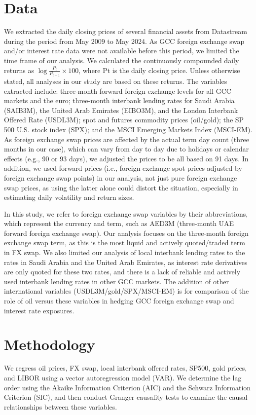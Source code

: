 \documentclass[12pt]{article}
\begin{document}
\begin{sloppypar}
\section{Data}
We extracted the daily closing prices of several financial assets from Datastream during the period from May 2009 to May 2024. As GCC foreign exchange swap and/or interest rate data were not available before this period, we limited the time frame of our analysis. We calculated the continuously compounded daily returns as $\log \frac{P_t}{P_{t-1}}\times 100$, where Pt is the daily closing price. Unless otherwise stated, all analyses in our study are based on these returns. The variables extracted include: three-month forward foreign exchange levels for all GCC markets and the euro; three-month interbank lending rates for Saudi Arabia (SAIB3M), the United Arab Emirates (EIBO3M), and the London Interbank Offered Rate (USDL3M); spot and futures commodity prices (oil/gold); the SP 500 U.S. stock index (SPX); and the MSCI Emerging Markets Index (MSCI-EM). As foreign exchange swap prices are affected by the actual term day count (three months in our case), which can vary from day to day due to holidays or calendar effects (e.g., 90 or 93 days), we adjusted the prices to be all based on 91 days. In addition, we used forward prices (i.e., foreign exchange spot prices adjusted by foreign exchange swap points) in our analysis, not just pure foreign exchange swap prices, as using the latter alone could distort the situation, especially in estimating daily volatility and return sizes. 

In this study, we refer to foreign exchange swap variables by their abbreviations, which represent the currency and term, such as AED3M (three-month UAE forward foreign exchange swap). Our analysis focuses on the three-month foreign exchange swap term, as this is the most liquid and actively quoted/traded term in FX swap. We also limited our analysis of local interbank lending rates to the rates in Saudi Arabia and the United Arab Emirates, as interest rate derivatives are only quoted for these two rates, and there is a lack of reliable and actively used interbank lending rates in other GCC markets. The addition of other international variables (USDL3M/gold/SPX/MSCI-EM) is for comparison of the role of oil versus these variables in hedging GCC foreign exchange swap and interest rate exposures.

\newpage
\section{Methodology}
We regress oil prices, FX swap, local interbank offered rates, SP500, gold prices, and LIBOR using a vector autoregression model (VAR). We determine the lag order using the Akaike Information Criterion (AIC) and the Schwarz Information Criterion (SIC), and then conduct Granger causality tests to examine the causal relationships between these variables.


\end{sloppypar}
\end{document}
